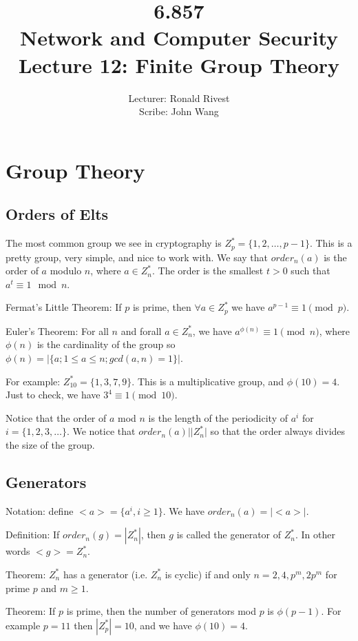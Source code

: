 \documentclass[psamsfonts]{amsart}
\title{6.857 \\
Network and Computer Security \\
Lecture 12: Finite Group Theory}
\author{Lecturer: Ronald Rivest\\
Scribe: John Wang}
\begin{document}
\maketitle

\section{Group Theory}

\subsection{Orders of Elts}

The most common group we see in cryptography is $Z_{p}^* = \{1,2, \ldots, p-1 \}$. This is a pretty group, very simple, and nice to work with. We say that $order_{n}(a)$ is the order of $a$ modulo $n$, where $a \in Z_{n}^*$. The order is the smallest $t > 0$ such that $a^t \equiv 1 \mod n$.

Fermat's Little Theorem: If $p$ is prime, then $\forall a \in Z_{p}^*$ we have $a^{p-1} \equiv 1 \pmod{p}$.

Euler's Theorem: For all $n$ and forall $a \in Z_{n}^*$, we have $a^{\phi(n)} \equiv 1 \pmod{n}$, where $\phi(n)$ is the cardinality of the group so $\phi(n) = |\{a; 1 \leq a \leq n; gcd(a,n) = 1 \} |$. 

For example: $Z_{10}^* = \{1, 3, 7, 9\}$. This is a multiplicative group, and $\phi(10) = 4$. Just to check, we have $3^{4} \equiv 1 \pmod{10}$.

Notice that the order of $a$ mod $n$ is the length of the periodicity of $a^{i}$ for $i = \{1,2,3,\ldots\}$. We notice that $order_{n}(a) | |Z_{n}^*|$ so that the order always divides the size of the group.

\subsection{Generators}

Notation: define $<a> = \{a^i, i \geq 1 \}$. We have $order_{n}(a) = |<a>|$.

Definition: If $order_{n}(g) = |Z_{n}^*|$, then $g$ is called the generator of $Z_{n}^*$. In other words $<g> = Z_{n}^*$.

Theorem: $Z_{n}^*$ has a generator (i.e. $Z_{n}^*$ is cyclic) if and only $n = 2,4, p^m, 2p^m$ for prime $p$ and $m \geq 1$.

Theorem: If $p$ is prime, then the number of generators mod $p$ is $\phi(p-1)$. For example $p = 11$ then $|Z_{p}^*| = 10$, and we have $\phi(10) = 4$.
\end{document}
